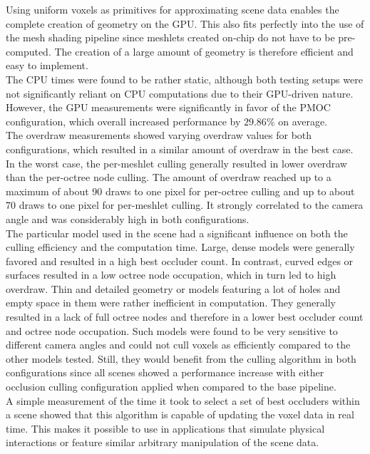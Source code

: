 \noindent
Using uniform voxels as primitives for approximating scene data enables the complete creation of geometry on the 
\ac{GPU}. This also fits perfectly into the use of the mesh shading pipeline since meshlets created on-chip do 
not have to be pre-computed. The creation of a large amount of geometry is therefore efficient and easy to 
implement. \\

\noindent
The \ac{CPU} times were found to be rather static, although both testing setups were not significantly reliant 
on \ac{CPU} computations due to their \ac{GPU}-driven nature. However, the \ac{GPU} measurements were significantly 
in favor of the \ac{PMOC} configuration, which overall increased performance by $29.86\%$ on average. \\

\noindent
The overdraw measurements showed varying overdraw values for both configurations, which resulted in a similar amount 
of overdraw in the best case. In the worst case, the per-meshlet culling generally resulted in lower overdraw than 
the per-octree node culling. The amount of overdraw reached up to a maximum of about 90 draws to one pixel for 
per-octree culling and up to about 70 draws to one pixel for per-meshlet culling. It strongly correlated to the 
camera angle and was considerably high in both configurations. \\ 

\noindent
The particular model used in the scene had a significant influence on both the culling efficiency and the computation 
time. Large, dense models were generally favored and resulted in a high best occluder count. In contrast, curved edges 
or surfaces resulted in a low octree node occupation, which in turn led to high overdraw. Thin and detailed geometry 
or models featuring a lot of holes and empty space in them were rather inefficient in computation. They generally 
resulted in a lack of full octree nodes and therefore in a lower best occluder count and octree node occupation. Such 
models were found to be very sensitive to different camera angles and could not cull voxels as efficiently compared 
to the other models tested. Still, they would benefit from the culling algorithm in both configurations since all 
scenes showed a performance increase with either occlusion culling configuration applied when compared to the base 
pipeline. \\

\noindent
A simple measurement of the time it took to select a set of best occluders within a scene showed that this algorithm 
is capable of updating the voxel data in real time. This makes it possible to use in applications that simulate physical 
interactions or feature similar arbitrary manipulation of the scene data.

